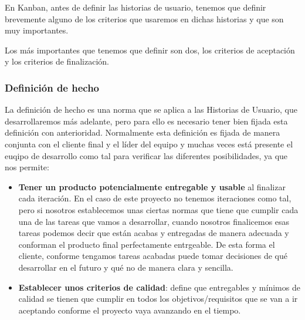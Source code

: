 En Kanban, antes de definir las historias de usuario, tenemos que definir brevemente alguno de los criterios que usaremos en dichas historias y que son muy importantes. 

Los más importantes que tenemos que definir son dos, los criterios de aceptación y los criterios de finalización.

\subsubsection{Definición de hecho}

La definición de hecho es una norma que se aplica a las Historias de Usuario, que desarrollaremos más adelante, pero para ello es necesario tener bien fijada esta definición con anterioridad. Normalmente esta definición es fijada de manera conjunta con el cliente final y el líder del equipo y muchas veces está presente el euqipo de desarrollo como tal para verificar las diferentes posibilidades, ya que nos permite:

\begin{itemize}
    \item \textbf{Tener un producto potencialmente entregable y usable} al finalizar cada iteración. En el caso de este proyecto no tenemos iteraciones como tal, pero si nosotros establecemos unas ciertas normas que tiene que cumplir cada una de las tareas que vamos a desarrollar, cuando nosotros finalicemos esas tareas podemos decir que están acabas y entregadas de manera adecuada y conforman el producto final perfectamente entrgeable. De esta forma el cliente, conforme tengamos tareas acabadas puede tomar decisiones de qué desarrollar en el futuro y qué no de manera clara y sencilla.
    
    \item \textbf{Establecer unos criterios de calidad}: define que entregables y mínimos de calidad se tienen que cumplir en todos los objetivos/requisitos que se van a ir aceptando conforme el proyecto vaya avanzando en el tiempo.
\end{itemize}

